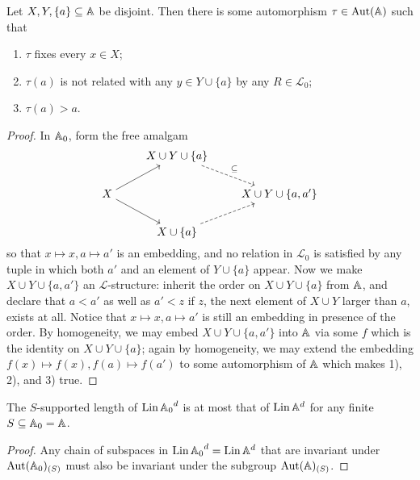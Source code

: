 \begin{lemma}\label{lem:free-fresh}
    Let $X, Y, \{a\} \subseteq \mathbb{A}$ be disjoint.
    Then there is some automorphism $\tau \in \operatorname{Aut}(\mathbb{A})$ such that
    \begin{enumerate}
        \item $\tau$ fixes every $x \in X$;
        \item $\tau(a)$ is not related with any $y \in Y \cup \{a\}$ by any $R \in \mathcal{L}_0$;
        \item $\tau(a) > a$.
    \end{enumerate}
\end{lemma}
\begin{proof}
    In $\mathbb{A}_0$, form the free amalgam
\[\begin{tikzcd}[cramped]
	& {X \cup Y \cup \{a\}} \\
	X && {X \cup Y \cup \{a, a'\}} \\
	& {X \cup \{a\}}
	\arrow["\subseteq", dashed, from=1-2, to=2-3]
	\arrow[from=2-1, to=1-2]
	\arrow[from=2-1, to=3-2]
	\arrow[dashed, from=3-2, to=2-3]
\end{tikzcd}\]
    so that $x \mapsto x, a \mapsto a'$ is an embedding,
    and no relation in $\mathcal{L}_0$ is satisfied by any tuple in which both $a'$ and an element of $Y \cup \{a\}$ appear.
    Now we make $X \cup Y \cup \{a, a'\}$ an $\mathcal{L}$-structure: 
    inherit the order on $X \cup Y \cup \{a\}$ from $\mathbb{A}$,
    and declare that $a < a'$ as well as $a' < z$ if $z$, the next element of $X \cup Y$ larger than $a$, exists at all.
    Notice that $x \mapsto x, a \mapsto a'$ is still an embedding in presence of the order.
    By homogeneity, we may embed $X \cup Y \cup \{a, a'\}$ into $\mathbb{A}$ via some $f$ which is the identity on $X \cup Y \cup \{a\}$;
    again by homogeneity, we may extend the embedding $f(x) \mapsto f(x), f(a) \mapsto f(a')$ to some automorphism of $\mathbb{A}$ which makes 1), 2), and 3) true.
\end{proof}

\begin{proposition}
    The $S$-supported length of $\operatorname{Lin} {\mathbb{A}_0}^d$ is at most that of $\operatorname{Lin} \mathbb{A}^d$ for any finite $S \subseteq \mathbb{A}_0 = \mathbb{A}$.
\end{proposition}
\begin{proof}
    Any chain of subspaces in $\operatorname{Lin} {\mathbb{A}_0}^d = \operatorname{Lin} \mathbb{A}^d$ that are invariant under $\operatorname{Aut}(\mathbb{A}_0)_{(S)}$ must also be invariant under the subgroup $\operatorname{Aut}(\mathbb{A})_{(S)}$.
\end{proof}
